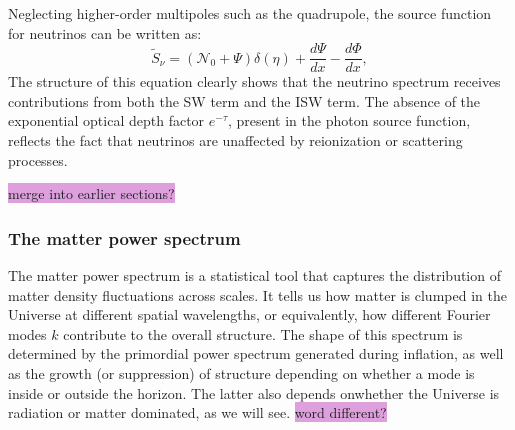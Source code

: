 \documentclass{aa}
\numberwithin{equation}{section}
\numberwithin{table}{section}
\numberwithin{figure}{section}
\begin{document}
Neglecting higher-order multipoles such as the quadrupole, the source function for neutrinos can be written as:
\begin{equation}
\tilde{S}_\nu = (\mathcal{N}_0 + \Psi)\delta(\eta) + \frac{d\Psi}{dx} - \frac{d\Phi}{dx},
\end{equation}
The structure of this equation clearly shows that the neutrino spectrum receives contributions from both the SW term and the ISW term. The absence of the exponential optical depth factor $e^{-\tau}$, present in the photon source function, reflects the fact that neutrinos are unaffected by reionization or scattering processes. 


\colorbox{Plum}{merge into earlier sections?}






\subsubsection{The matter power spectrum}
The matter power spectrum is a statistical tool that captures the distribution of matter density fluctuations across scales. It tells us how matter is clumped in the Universe at different spatial wavelengths, or equivalently, how different Fourier modes $k$ contribute to the overall structure. The shape of this spectrum is determined by the primordial power spectrum generated during inflation, as well as the growth (or suppression) of structure depending on whether a mode is inside or outside the horizon. The latter also depends onwhether the Universe is radiation or matter dominated, as we will see. \colorbox{Plum}{word different?}
\end{document}
